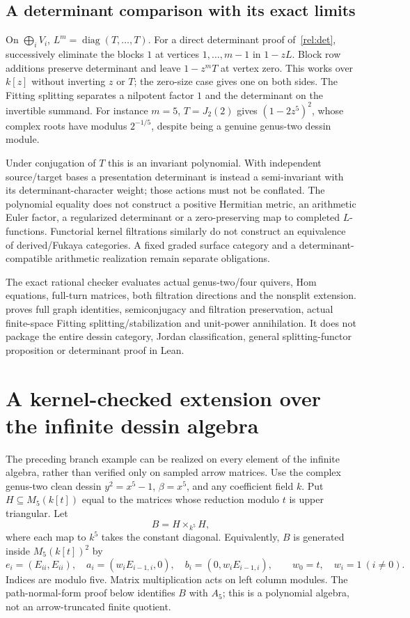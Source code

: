 \documentclass[11pt,oneside,openany]{book}
\theoremstyle{definition}\newtheorem{definition}[theorem]{Definition}
\theoremstyle{remark}\newtheorem{remark}[theorem]{Remark}
\begin{document}
\subsection{A determinant comparison with its exact limits}
On $\bigoplus_iV_i$, $L^m=\operatorname{diag}(T,\ldots,T)$.
For a direct determinant proof of~\eqref{rel:det}, successively eliminate
the blocks $1$ at vertices $1,\ldots,m-1$ in $1-zL$.
Block row additions preserve determinant and leave $1-z^mT$ at vertex
zero. This works over $k[z]$ without inverting $z$ or $T$; the zero-size
case gives one on both sides. The Fitting splitting separates a nilpotent
factor $1$ and the determinant on the invertible summand. For instance
$m=5$, $T=J_2(2)$ gives $(1-2z^5)^2$, whose complex roots have modulus
$2^{-1/5}$, despite being a genuine genus-two dessin module.

Under conjugation of $T$ this is an invariant polynomial. With independent
source/target bases a presentation determinant is instead a semi-invariant
with its determinant-character weight; those actions must not be conflated.
The polynomial equality does not construct a positive Hermitian metric,
an arithmetic Euler factor, a regularized determinant or a zero-preserving
map to completed $L$-functions. Functorial kernel filtrations similarly do
not construct an equivalence of derived/Fukaya categories. A fixed graded
surface category and a determinant-compatible arithmetic realization remain
separate obligations.

The exact rational checker evaluates actual genus-two/four quivers, Hom
equations, full-turn matrices, both filtration directions and the nonsplit
extension.  proves full graph
identities, semiconjugacy and filtration preservation, actual finite-space
Fitting splitting/stabilization and unit-power annihilation. It does not
package the entire dessin category, Jordan classification, general
splitting-functor proposition or determinant proof in Lean.


\section{A kernel-checked extension over the infinite dessin algebra}
\label{bre:core}
The preceding branch example can be realized on every element of the
infinite algebra, rather than verified only on sampled arrow matrices.
Use the complex genus-two clean dessin $y^2=x^5-1$, $\beta=x^5$, and any
coefficient field $k$. Put $H\subseteq M_5(k[t])$ equal to the matrices
whose reduction modulo $t$ is upper triangular. Let
\[
 B=H\mathbin{\times}_{k^5}H,
\]
where each map to $k^5$ takes the constant diagonal. Equivalently, $B$ is
generated inside $M_5(k[t])^2$ by
\[
 e_i=(E_{ii},E_{ii}),\quad
 a_i=(w_iE_{i-1,i},0),\quad b_i=(0,w_iE_{i-1,i}),
 \qquad w_0=t,\quad w_i=1\ (i\ne0).
\]
Indices are modulo five. Matrix multiplication acts on left column
modules. The path-normal-form proof below identifies $B$ with $A_5$;
this is a polynomial algebra, not an arrow-truncated finite quotient.
\end{document}
